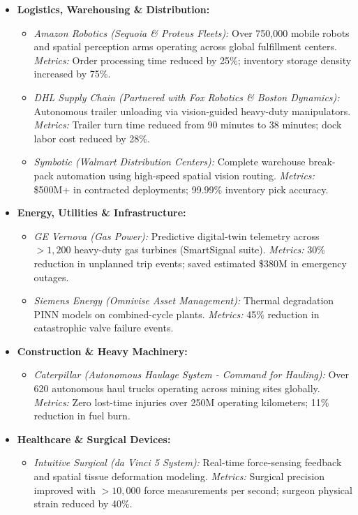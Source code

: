 \documentclass[11pt,a4paper]{article}
\begin{document}
\begin{itemize}
    \item \textbf{Logistics, Warehousing \& Distribution:}
    \begin{itemize}
        \item \textit{Amazon Robotics (Sequoia \& Proteus Fleets):} Over 750,000 mobile robots and spatial perception arms operating across global fulfillment centers. \textit{Metrics:} Order processing time reduced by 25\%; inventory storage density increased by 75\%.
        \item \textit{DHL Supply Chain (Partnered with Fox Robotics \& Boston Dynamics):} Autonomous trailer unloading via vision-guided heavy-duty manipulators. \textit{Metrics:} Trailer turn time reduced from 90 minutes to 38 minutes; dock labor cost reduced by 28\%.
        \item \textit{Symbotic (Walmart Distribution Centers):} Complete warehouse break-pack automation using high-speed spatial vision routing. \textit{Metrics:} \$500M+ in contracted deployments; 99.99\% inventory pick accuracy.
    \end{itemize}

    \item \textbf{Energy, Utilities \& Infrastructure:}
    \begin{itemize}
        \item \textit{GE Vernova (Gas Power):} Predictive digital-twin telemetry across $>1,200$ heavy-duty gas turbines (SmartSignal suite). \textit{Metrics:} 30\% reduction in unplanned trip events; saved estimated \$380M in emergency outages.
        \item \textit{Siemens Energy (Omnivise Asset Management):} Thermal degradation PINN models on combined-cycle plants. \textit{Metrics:} 45\% reduction in catastrophic valve failure events.
    \end{itemize}

    \item \textbf{Construction \& Heavy Machinery:}
    \begin{itemize}
        \item \textit{Caterpillar (Autonomous Haulage System - Command for Hauling):} Over 620 autonomous haul trucks operating across mining sites globally. \textit{Metrics:} Zero lost-time injuries over 250M operating kilometers; 11\% reduction in fuel burn.
    \end{itemize}

    \item \textbf{Healthcare \& Surgical Devices:}
    \begin{itemize}
        \item \textit{Intuitive Surgical (da Vinci 5 System):} Real-time force-sensing feedback and spatial tissue deformation modeling. \textit{Metrics:} Surgical precision improved with $>10,000$ force measurements per second; surgeon physical strain reduced by 40\%.
    \end{itemize}
\end{itemize}
\end{document}
